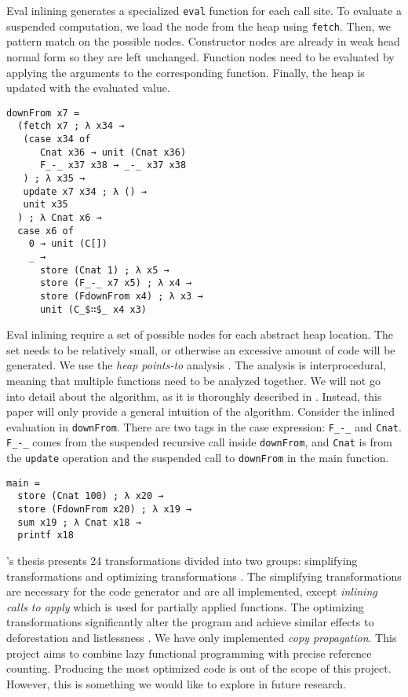\documentclass[10pt, twocolumn]{article}
\begin{document}
Eval inlining generates a specialized \lstinline{eval} function for each call site.
To evaluate a suspended computation, we load the node from the heap using \lstinline{fetch}. 
Then, we pattern match on the possible nodes. 
Constructor nodes are already in weak head normal form so they are left unchanged.
Function nodes need to be evaluated by applying the arguments to the corresponding function.
Finally, the heap is updated with the evaluated value.

\begin{lstlisting}[xleftmargin=24pt]
downFrom x7 =
  (fetch x7 ; λ x34 →
   (case x34 of
      Cnat x36 → unit (Cnat x36)
      F_-_ x37 x38 → _-_ x37 x38
   ) ; λ x35 →
   update x7 x34 ; λ () →
   unit x35
  ) ; λ Cnat x6 →
  case x6 of
    0 → unit (C[])
    _ →
      store (Cnat 1) ; λ x5 →
      store (F_-_ x7 x5) ; λ x4 →
      store (FdownFrom x4) ; λ x3 →
      unit (C_$∷$_ x4 x3)
\end{lstlisting}

Eval inlining require a set of possible nodes for each abstract heap location.
The set needs to be relatively small, or otherwise an excessive amount of code will be generated.
We use the \emph{heap points-to} analysis \citep{johnsson1991}.
The analysis is interprocedural, meaning that multiple functions need to be analyzed together.
We will not go into detail about the algorithm, as it is thoroughly described in \citep{boquist1996}. 
Instead, this paper will only provide a general intuition of the algorithm.
Consider the inlined evaluation in \lstinline{downFrom}.
There are two tags in the case expression: \lstinline{F_-_} and \lstinline{Cnat}. 
\lstinline{F_-_} comes from the suspended recursive call inside \lstinline{downFrom}, and 
\lstinline{Cnat} is from the \lstinline{update} operation and the suspended call to \lstinline{downFrom} in the main function.

\begin{lstlisting}[xleftmargin=24pt]
main =
  store (Cnat 100) ; λ x20 →
  store (FdownFrom x20) ; λ x19 →
  sum x19 ; λ Cnat x18 →
  printf x18
\end{lstlisting}

\citeauthor{boquist1999}'s thesis presents 24 transformations divided into two groups: simplifying transformations and optimizing 
transformations \citep{boquist1999}. 
The simplifying transformations are necessary for the code generator and are all implemented, except \emph{inlining calls to apply}
which is used for partially applied functions. 
The optimizing transformations significantly alter the program and achieve similar effects to deforestation \citep{wadler1988} and listlessness \citep{wadler1984}.
We have only implemented \emph{copy propagation}.
This project aims to combine lazy functional programming with precise reference counting. 
Producing the most optimized code is out of the scope of this project. 
However, this is something we would like to explore in future research.
\end{document}
